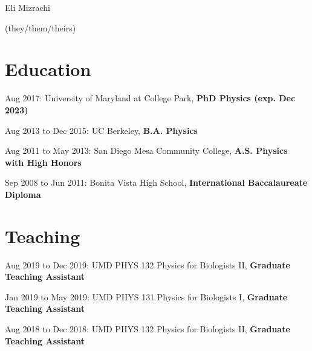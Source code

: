 \documentclass[
]{scrartcl}
\author{}
\date{}
\begin{document}

\ifdefined\Shaded\renewenvironment{Shaded}{\begin{tcolorbox}[interior hidden, borderline west={3pt}{0pt}{shadecolor}, frame hidden, boxrule=0pt, enhanced, sharp corners, breakable]}{\end{tcolorbox}}\fi

\begin{center}

\begin{LARGE}Eli Mizrachi\end{LARGE}

\begin{small}(they/them/theirs)\end{small}

\href{mailto:emiz@umd.edu}{}
\href{https://github.com/e-miz}{}
\href{https://e-miz.github.io}{}

\end{center}

\hypertarget{fa-user-graduate-education}{%
\section{\texorpdfstring{
Education}{ Education}}\label{fa-user-graduate-education}}

Aug 2017: University of Maryland at College Park, \textbf{PhD Physics
(exp. Dec 2023)}

Aug 2013 to Dec 2015: UC Berkeley, \textbf{B.A. Physics}

Aug 2011 to May 2013: San Diego Mesa Community College, \textbf{A.S.
Physics with High Honors}

Sep 2008 to Jun 2011: Bonita Vista High School, \textbf{International
Baccalaureate Diploma}

\hypertarget{fa-school-teaching}{%
\section{\texorpdfstring{
Teaching}{ Teaching}}\label{fa-school-teaching}}

Aug 2019 to Dec 2019: UMD PHYS 132 Physics for Biologists II,
\textbf{Graduate Teaching Assistant}

Jan 2019 to May 2019: UMD PHYS 131 Physics for Biologists I,
\textbf{Graduate Teaching Assistant}

Aug 2018 to Dec 2018: UMD PHYS 132 Physics for Biologists II,
\textbf{Graduate Teaching Assistant}
\end{document}
